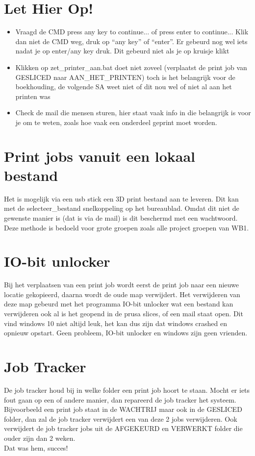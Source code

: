 \documentclass{article}
\newcommand{\quotes}[1]{``#1''}
\begin{document}
\section*{Let Hier Op!}
\begin{itemize}
  \item Vraagd de CMD press any key to continue... of press enter to continue... Klik dan niet de CMD weg, druk op \quotes{any key} of \quotes{enter}. Er gebeurd nog wel iets nadat je op enter/any key druk. Dit gebeurd niet als je op kruisje klikt
  \item Klikken op zet\_printer\_aan.bat doet niet zoveel (verplaatst de print job van GESLICED naar AAN\_HET\_PRINTEN) toch is het belangrijk voor de boekhouding, de volgende SA weet niet of dit nou wel of niet al aan het printen was
  \item Check de mail die mensen sturen, hier staat vaak info in die belangrijk is voor je om te weten, zoals hoe vaak een onderdeel geprint moet worden.
\end{itemize}

\section*{Print jobs vanuit een lokaal bestand}
Het is mogelijk via een usb stick een 3D print bestand aan te leveren. Dit kan met de selecteer\_bestand snelkoppeling op het bureaublad. Omdat dit niet de gewenste manier is (dat is via de mail) is dit beschermd met een wachtwoord. Deze methode is bedoeld voor grote groepen zoals alle project groepen van WB1. 

\section*{IO-bit unlocker}
Bij het verplaatsen van een print job wordt eerst de print job naar een nieuwe locatie gekopieerd, daarna wordt de oude map verwijdert. Het verwijderen van deze map gebeurd met het programma IO-bit unlocker wat een bestand kan verwijderen ook al is het geopend in de prusa slices, of een mail staat open. Dit vind windows 10 niet altijd leuk, het kan dus zijn dat windows crashed en opnieuw opstart. Geen probleem, IO-bit unlocker en windows zijn geen vrienden.

\section*{Job Tracker}
De job tracker houd bij in welke folder een print job hoort te staan. Mocht er iets fout gaan op een of andere manier, dan repareerd de job tracker het systeem. Bijvoorbeeld een print job staat in de WACHTRIJ maar ook in de GESLICED folder, dan zal de job tracker verwijdert een van deze 2 jobs verwijderen. Ook verwijdert de job tracker jobs uit de AFGEKEURD en VERWERKT folder die ouder zijn dan 2 weken.\\  

Dat was hem, succes!
\end{document}
